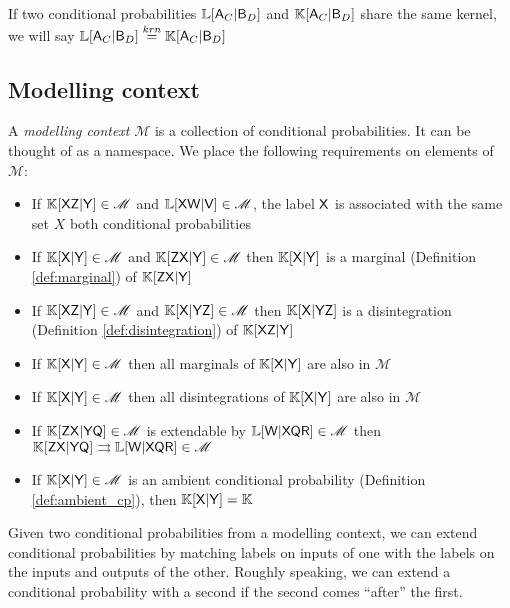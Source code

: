 If two conditional probabilities $\mathbb{L}[\mathsf{A}_C|\mathsf{B}_D]$ and $\mathbb{K}[\mathsf{A}_C|\mathsf{B}_D]$ share the same kernel, we will say $\mathbb{L}[\mathsf{A}_C|\mathsf{B}_D]\overset{krn}{=}\mathbb{K}[\mathsf{A}_C|\mathsf{B}_D]$

\subsection{Modelling context}

A \emph{modelling context} $\mathscr{M}$ is a collection of conditional probabilities. It can be thought of as a namespace. We place the following requirements on elements of $\mathscr{M}$:

\begin{itemize}
	\item If $\mathbb{K}[\mathsf{X}\mathsf{Z}|\mathsf{Y}]\in \mathscr{M}$ and $\mathbb{L}[\mathsf{X}\mathsf{W}|\mathsf{V}]\in \mathscr{M}$, the label $\mathsf{X}$ is associated with the same set $X$ both conditional probabilities
	\item If $\mathbb{K}[\mathsf{X}|\mathsf{Y}]\in \mathscr{M}$ and $\mathbb{K}[\mathsf{Z}\mathsf{X}|\mathsf{Y}]\in\mathscr{M}$ then $\mathbb{K}[\mathsf{X}|\mathsf{Y}]$ is a marginal (Definition \ref{def:marginal}) of $\mathbb{K}[\mathsf{Z}\mathsf{X}|\mathsf{Y}]$
	\item If $\mathbb{K}[\mathsf{X}\mathsf{Z}|\mathsf{Y}]\in \mathscr{M}$ and $\mathbb{K}[\mathsf{X}|\mathsf{Y}\mathsf{Z}]\in \mathscr{M}$ then $\mathbb{K}[\mathsf{X}|\mathsf{Y}\mathsf{Z}]$ is a disintegration (Definition \ref{def:disintegration}) of $\mathbb{K}[\mathsf{X}\mathsf{Z}|\mathsf{Y}]$
	\item If $\mathbb{K}[\mathsf{X}|\mathsf{Y}]\in \mathscr{M}$ then all marginals of $\mathbb{K}[\mathsf{X}|\mathsf{Y}]$ are also in $\mathscr{M}$
	\item If $\mathbb{K}[\mathsf{X}|\mathsf{Y}]\in \mathscr{M}$ then all disintegrations of $\mathbb{K}[\mathsf{X}|\mathsf{Y}]$ are also in $\mathscr{M}$
	\item If $\mathbb{K}[\mathsf{Z}\mathsf{X}|\mathsf{Y}\mathsf{Q}]\in \mathscr{M}$ is extendable by $\mathbb{L}[\mathsf{W}|\mathsf{X}\mathsf{Q}\mathsf{R}]\in \mathscr{M}$ then $\mathbb{K}[\mathsf{Z}\mathsf{X}|\mathsf{Y}\mathsf{Q}]\rightrightarrows \mathbb{L}[\mathsf{W}|\mathsf{X}\mathsf{Q}\mathsf{R}] \in \mathscr{M}$
	\item If $\mathbb{K}[\mathsf{X}|\mathsf{Y}]\in \mathscr{M}$ is an ambient conditional probability (Definition \ref{def:ambient_cp}), then $\mathbb{K}[\mathsf{X}|\mathsf{Y}]=\mathbb{K}$
\end{itemize}

Given two conditional probabilities from a modelling context, we can extend conditional probabilities by matching labels on inputs of one with the labels on the inputs and outputs of the other. Roughly speaking, we can extend a conditional probability with a second if the second comes ``after'' the first.

